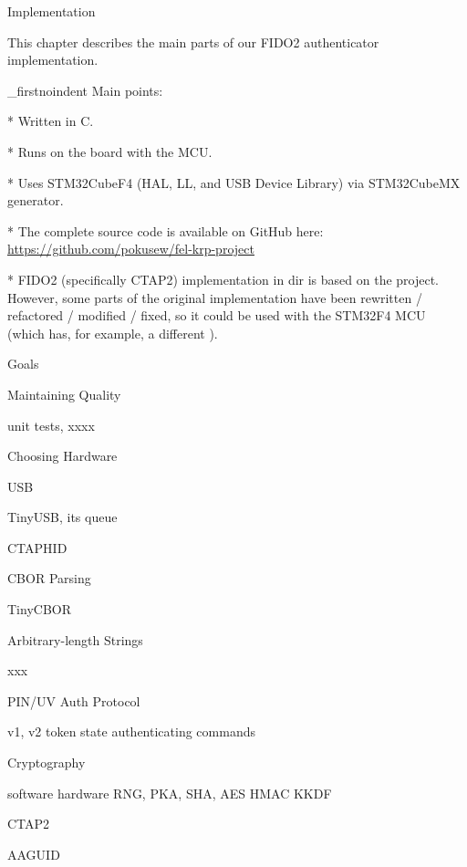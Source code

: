 \chap[implementation] Implementation

This chapter describes the main parts of our FIDO2 authenticator implementation.

\_firstnoindent
{\sbf Main points:}

\begitems

* Written in {\sbf C}.

* Runs on the  board with the  MCU.

* Uses STM32CubeF4 (HAL, LL, and USB Device Library) via STM32CubeMX generator.

* The complete source code is available on GitHub here:\nl
\url{https://github.com/pokusew/fel-krp-project}

* FIDO2 (specifically CTAP2) implementation in  dir is based on the  project. However, some parts of the original implementation have been rewritten / refactored / modified / fixed, so it could be used with the STM32F4 MCU (which has, for example, a different ).

\enditems


\sec Goals


\sec Maintaining Quality

unit tests, xxxx

\sec Choosing Hardware

\sec USB

TinyUSB, its queue

\sec CTAPHID

\sec CBOR Parsing

TinyCBOR

\sec Arbitrary-length Strings

xxx


\sec PIN/UV Auth Protocol

v1, v2
token state
authenticating commands

\sec Cryptography

software
hardware
RNG, PKA, SHA, AES
HMAC
KKDF




\sec CTAP2

\secc AAGUID

